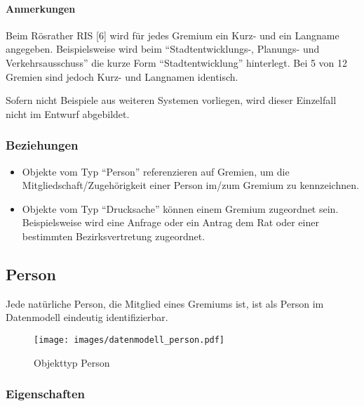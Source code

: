 \documentclass[,a4paper]{article}
\makeatletter
\def\maxwidth{\ifdim\Gin@nat@width>\linewidth\linewidth
\else\Gin@nat@width\fi}
\let\Oldincludegraphics\includegraphics
\renewcommand{\includegraphics}[1]{\Oldincludegraphics[width=\maxwidth]{#1}}
\makeatother
\begin{document}
\paragraph{Anmerkungen}

Beim Rösrather RIS {[}6{]} wird für jedes Gremium ein Kurz- und ein
Langname angegeben. Beispielsweise wird beim ``Stadtentwicklungs-,
Planungs- und Verkehrsausschuss'' die kurze Form ``Stadtentwicklung''
hinterlegt. Bei 5 von 12 Gremien sind jedoch Kurz- und Langnamen
identisch.

Sofern nicht Beispiele aus weiteren Systemen vorliegen, wird dieser
Einzelfall nicht im Entwurf abgebildet.

\subsubsection{Beziehungen}

\begin{itemize}
\item
  Objekte vom Typ ``Person'' referenzieren auf Gremien, um die
  Mitgliedschaft/Zugehörigkeit einer Person im/zum Gremium zu
  kennzeichnen.
\item
  Objekte vom Typ ``Drucksache'' können einem Gremium zugeordnet sein.
  Beispielsweise wird eine Anfrage oder ein Antrag dem Rat oder einer
  bestimmten Bezirksvertretung zugeordnet.
\end{itemize}

\subsection{Person}

Jede natürliche Person, die Mitglied eines Gremiums ist, ist als Person
im Datenmodell eindeutig identifizierbar.

\begin{figure}[htbp]
\centering
\texttt{[image: images/datenmodell\_person.pdf]}
\caption{Objekttyp Person}
\end{figure}

\subsubsection{Eigenschaften}
\end{document}
